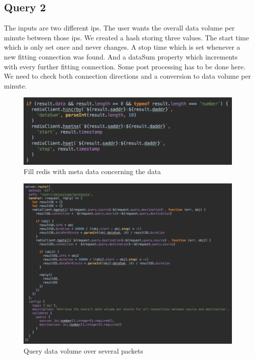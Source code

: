 \subsection{Query 2}
The inputs are two different ips. The user wants the overall data volume per minute between those ips. We created a hash storing three values. The start time which is only set once and never changes. A stop time which is set whenever a new fitting connection was found. And a dataSum property which increments with every further fitting connection. Some post processing has to be done here. We need to check both connection directions and a conversion to data volume per minute.

  \begin{figure}[htb!]
	\centerline{\includegraphics[width=1.0\textwidth]{resources/solution2-4.png}}
	\caption{Fill redis with meta data concerning the data}
	\label{query2}
\end{figure}

\begin{figure}[htb!]
	\centerline{\includegraphics[width=1.0\textwidth]{resources/solution2-5.png}}
	\caption{Query data volume over several packets}
	\label{query22}
\end{figure}

